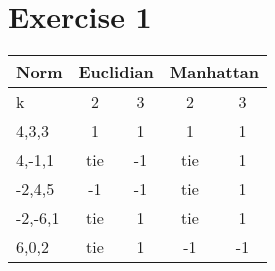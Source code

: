 \section*{Exercise 1}
  \begin{tabular}{l|c|c|c|c}
    Norm&\multicolumn{2}{c}{Euclidian}&\multicolumn{2}{c}{Manhattan}\\\hline
    k&2&3&2&3\\\hline
    4,3,3&1&1&1&1\\
    4,-1,1&tie&-1&tie&1\\
    -2,4,5&-1&-1&tie&1\\
    -2,-6,1&tie&1&tie&1\\
    6,0,2&tie&1&-1&-1
  \end{tabular}
